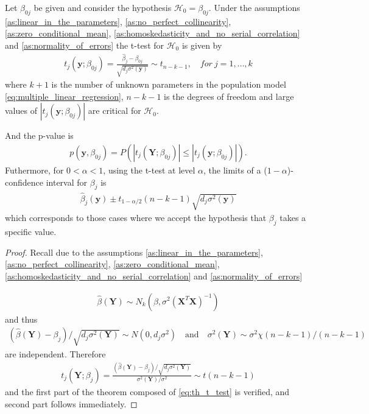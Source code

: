 \begin{theorem}  \label{th:t_distribution}
Let $\beta_{0j}$ be given and consider the hypothesis $\mathcal{H}_0=\beta_{0j}$. Under the assumptions \ref{as:linear_in_the_parameters}, \ref{as:no_perfect_collinearity}, \ref{as:zero_conditional_mean}, \ref{as:homoskedasticity_and_no_serial_correlation} and \ref{as:normality_of_errors} the t-test for $\mathcal{H}_0$ is given by
\begin{align}
   t_j(\textbf{y};\beta_{0j}) = \frac{\hat{\beta}_j - \beta_{0j}}{\sqrt{d_j\sigma^2(\textbf{y})}}\sim t_{n-k-1}, \quad for \ j=1,\ldots,k
\end{align}
where $k+1$ is the number of unknown parameters in the population model \eqref{eq:multiple_linear_regression}, $n-k-1$ is the degrees of freedom and large values of $|t_j(\textbf{y};\beta_{0j})|$ are critical for $\mathcal{H}_0$.

And the p-value is
\begin{align}
    p(\textbf{y},\beta_{0j})=P(|t_j(\textbf{Y};\beta_{0j})|\leq |t_j(\textbf{y};\beta_{0j})|).
\end{align}
Futhermore, for $0<\alpha<1$, using the t-test at level $\alpha$, the limits of a ($1-\alpha$)-confidence interval for $\beta_j$ is
\begin{align} \label{eq:t_statistic}
    \hat{\beta}_{j}(\textbf{y}) \pm t_{1-\alpha/2}(n-k-1)\sqrt{d_j\sigma^2(\textbf{y})}
\end{align}
which corresponds to those cases where we accept the hypothesis that $\beta_j$ takes a specific value.
\end{theorem}
\begin{proof}
Recall due to the assumptions \ref{as:linear_in_the_parameters}, \ref{as:no_perfect_collinearity}, \ref{as:zero_conditional_mean}, \ref{as:homoskedasticity_and_no_serial_correlation} and \ref{as:normality_of_errors}

\begin{align} \label{eq:th_t_test}
    \hat{\beta}(\textbf{Y}) \sim N_k(\beta,\sigma^2(\textbf{X}^T\textbf{X})^{-1})
\end{align}
and thus
\begin{align*}
    (\hat{\beta}(\textbf{Y})-\beta_j)/\sqrt{d_j\sigma^2(\textbf{Y})} \sim N(0,d_j \sigma^2) \quad \text{and} \quad \sigma^2(\textbf{Y}) \sim \sigma^2\chi (n-k-1)/(n-k-1)
\end{align*}
are independent. Therefore
\begin{align*}
    t_j(\textbf{Y};\beta_j)=\frac{(\hat{\beta}(\textbf{Y})-\beta_j)/\sqrt{d_j\sigma^2(\textbf{Y})}}{\sigma^2(\textbf{Y})/\sigma^2} \sim t(n-k-1)
\end{align*}
and the first part of the theorem composed of \eqref{eq:th_t_test} is verified, and second part follows immediately. 
\end{proof}

